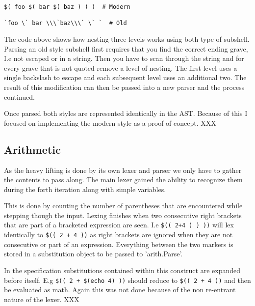 \begin{verbatim}
$( foo $( bar $( baz ) ) )  # Modern

`foo \` bar \\\`baz\\\` \` `  # Old
\end{verbatim}
The code above shows how nesting three levels works using both type of subshell.
Parsing an old style subshell first requires that you find the correct ending grave, I.e not escaped or in a string.
Then you have to scan through the string and for every grave that is not quoted remove a level of nesting.
The first level uses a single backslash to escape and each subsequent level uses an additional two.
The result of this modification can then be passed into a new parser and the process continued.

Once parsed both styles are represented identically in the AST.
Because of this I focused on implementing the modern style as a proof of concept.
XXX

\subsection{Arithmetic} \label{sec:main-lexer-arith}
As the heavy lifting is done by its own lexer and parser we only have to gather the contents to pass along.
The main lexer gained the ability to recognize them during the forth iteration along with simple variables.

This is done by counting the number of parentheses that are encountered while stepping though the input.
Lexing finishes when two consecutive right brackets that are part of a bracketed expression are seen.
I.e \verb!$(( 2+4 ) ) ))! will lex identically to \verb!$(( 2 + 4 ))! as right brackets are ignored when they are not consecutive or part of an expression.
Everything between the two markers is stored in a substitution object to be passed to 'arith.Parse'.

In the specification substitutions contained within this construct are expanded before itself.
E.g \verb!$(( 2 + $(echo 4) ))! should reduce to \verb!$(( 2 + 4 ))! and then be evaluated as math.
Again this was not done because of the non re-entrant nature of the lexer. XXX












